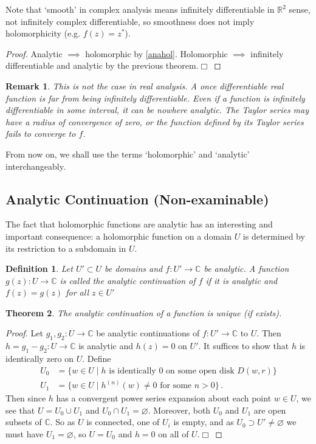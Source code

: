 \documentclass{article}
\theoremstyle{plain}\theoremheaderfont{\normalfont\itshape}\theorembodyfont{\rmfamily}\theoremseparator{.}\newtheorem*{rem}{Remark}\newtheorem*{ex}{Example}\newtheorem*{proof}{Proof}\newtheorem*{altp}{Alternative proof}
\theoremstyle{plain}\theoremheaderfont{\normalfont\bfseries}\theorembodyfont{\rmfamily}\theoremseparator{.}\newtheorem{thm}{Theorem}[section]\newtheorem{lem}[thm]{Lemma}\newtheorem{prop}[thm]{Proposition}\newtheorem*{cor}{Corollary}\newtheorem{defn}[thm]{Definition}\newtheorem{clm}[thm]{Claim}\newtheorem{clminproof}{Claim}
\theoremstyle{break}\theoremheaderfont{\normalfont\itshape}\theorembodyfont{\rmfamily}\theoremseparator{.\medskip}\newtheorem*{proofskip}{Proof}\newtheorem*{exs}{Examples}\newtheorem*{rems}{Remarks}
\theoremstyle{break}\theoremheaderfont{\normalfont\bfseries}\theorembodyfont{\rmfamily}\theoremseparator{.\medskip}\newtheorem{lemskip}[thm]{Lemma}\newtheorem{defnskip}[thm]{Definition}\newtheorem{propskip}[thm]{Proposition}\newtheorem{thmskip}[thm]{Theorem}
\numberwithin{equation}{section}
\newcommand{\qed}{\hfill\ensuremath{\Box}}
\begin{document}
	Note that `smooth' in complex analysis means infinitely differentiable in \(\mathbb{R}^2\) sense, not infinitely complex differentiable, so smoothness does not imply holomorphicity (e.g. \(f(z)=z^*\)).
	\begin{proof}
		Analytic \(\implies\) holomorphic by \cref{anahol}. Holomorphic \(\implies\) infinitely differentiable and analytic by the previous theorem.\qed
	\end{proof}
	\begin{rem}
		This is not the case in real analysis. A once differentiable real function is far from being infinitely differentiable. Even if a function is infinitely differentiable in some interval, it can be nowhere analytic. The Taylor series may have a radius of convergence of zero, or the function defined by its Taylor series fails to converge to \(f\).
	\end{rem}

	From now on, we shall use the terms `holomorphic' and `analytic' interchangeably.

	\subsection{Analytic Continuation (Non-examinable)}
	The fact that holomorphic functions are analytic has an interesting and important consequence: a holomorphic function on a domain \(U\) is determined by its restriction to a subdomain in \(U\).
	\begin{defn}
		Let \(U'\subset U\) be domains and \(f:U'\to\mathbb{C}\) be analytic. A function \(g(z):U\to\mathbb{C}\) is called the \textit{analytic continuation} of \(f\) if it is analytic and \(f(z)=g(z)\) for all \(z\in U'\)
	\end{defn}

	\begin{thm}
		The analytic continuation of a function is unique (if exists).
	\end{thm}
	\begin{proof}
		Let \(g_1,g_2:U\to\mathbb{C}\) be analytic continuations of \(f:U'\to\mathbb{C}\) to \(U\). Then \(h=g_1-g_2:U\to\mathbb{C}\) is analytic and \(h(z)=0\) on \(U'\). It suffices to show that \(h\) is identically zero on \(U\). Define
		\begin{align*}
			U_0&=\{w\in U\mid h\text{ is identically 0 on some open disk }D(w,r)\}\\
			U_1&=\{w\in U\mid h^{(n)}(w)\ne 0\text{ for some }n>0\}\,.
		\end{align*}
		Then since \(h\) has a convergent power series expansion about each point \(w\in U\), we see that \(U=U_0\cup U_1\) and \(U_0\cap U_1=\varnothing\). Moreover, both \(U_0\) and \(U_1\) are open subsets of \(\mathbb{C}\). So as \(U\) is connected, one of \(U_i\) is empty, and as \(U_0\supset U'\ne\varnothing\) we must have \(U_1=\varnothing\), so \(U=U_0\) and \(h=0\) on all of \(U\).\qed
	\end{proof}
\end{document}
